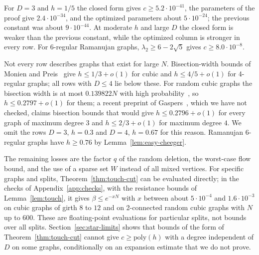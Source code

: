For $D=3$ and $h=1/5$ the closed form gives $c\ge5.2\cdot10^{-41}$, the parameters of the proof give $2.4\cdot10^{-34}$, and the optimized parameters about $5\cdot10^{-24}$; the previous constant was about $9\cdot10^{-44}$. At moderate $h$ and large $D$ the closed form is weaker than the previous constant, while the optimized column is stronger in every row. For 6-regular Ramanujan graphs, $\lambda_2\ge6-2\sqrt5$ gives $c\ge8.0\cdot10^{-8}$.

Not every row describes graphs that exist for large $N$. Bisection-width bounds of Monien and Preis~\cite{MoniePreis06} give $h\le1/3+o(1)$ for cubic and $h\le4/5+o(1)$ for 4-regular graphs; all rows with $D\le4$ lie below these. For random cubic graphs the bisection width is at most $0.139822N$ with high probability~\cite{LichevMitsche23}, so $h\le0.2797+o(1)$ for them; a recent preprint of Gaspers~\cite{Gaspers26}, which we have not checked, claims bisection bounds that would give $h\le0.2796+o(1)$ for every graph of maximum degree $3$ and $h\le2/3+o(1)$ for maximum degree $4$. We omit the rows $D=3$, $h=0.3$ and $D=4$, $h=0.67$ for this reason. Ramanujan 6-regular graphs have $h\ge0.76$ by Lemma~\ref{lem:easy-cheeger}.

The remaining losses are the factor $q$ of the random deletion, the worst-case flow bound, and the use of a sparse set $W$ instead of all mixed vertices. For specific graphs and splits, Theorem~\ref{thm:touch-cut} can be evaluated directly; in the checks of Appendix~\ref{app:checks}, with the resistance bounds of Lemma~\ref{lem:touch}, it gives $\beta\le e^{-xN}$ with $x$ between about $5\cdot10^{-4}$ and $1.6\cdot10^{-3}$ on cubic graphs of girth $8$ to $12$ and on 2-connected random cubic graphs with $N$ up to $600$. These are floating-point evaluations for particular splits, not bounds over all splits. Section~\ref{sec:star-limits} shows that bounds of the form of Theorem~\ref{thm:touch-cut} cannot give $c\ge\mathrm{poly}(h)$ with a degree independent of $D$ on some graphs, conditionally on an expansion estimate that we do not prove.
